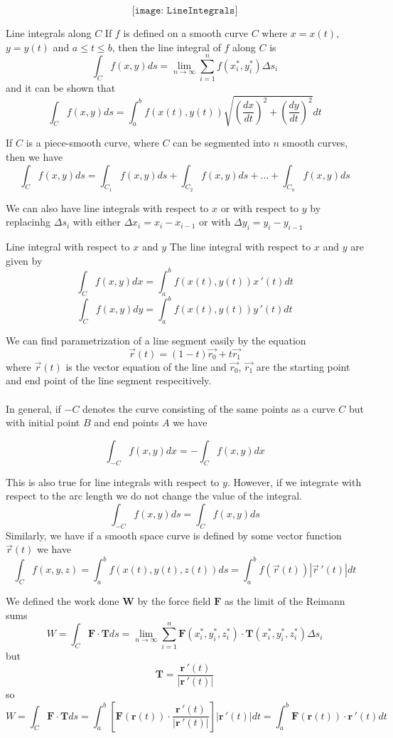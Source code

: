\documentclass{article}
\begin{document}
	\[
		\texttt{[image: LineIntegrals]}
	\]
	\begin{mybox}
		{Line integrals along $C$} If $f$ is defined on a smooth curve $C$ where $x=x
		(t)$, $y=y(t)$ and $a\leq t \leq b$, then the line integral of $f$ along $C$
		is
		\[
			\int_{C} f(x,y)ds = \lim_{n \to \infty}\sum_{i=1}^{n}f(x_{i}^{*}, y_{i}^{*}
			) \Delta s_{i}
		\]
		and it can be shown that
		\[
			\int_{C} f(x,y)ds = \int_{a}^{b} f(x(t),y(t))\sqrt{(\frac{dx}{dt})^{2} + (\frac{dy}{dt})^{2}
			}dt
		\]
	\end{mybox}

	If $C$ is a piece-smooth curve, where $C$ can be segmented into $n$ smooth curves,
	then we have
	\[
		\int_{C} f(x,y)ds = \int_{C_1}f(x,y)ds + \int_{C_2}f(x,y)ds + ...+ \int_{C_n}
		f(x,y)ds
	\]

	We can also have line integrals with respect to $x$ or with respect to $y$ by replacinhg
	$\Delta s_{i}$ with either $\Delta x_{i} = x_{i} - x_{i-1}$ or with $\Delta y_{i}
	= y_{i} - y_{i-1}$

	\begin{mybox}
		{Line integral with respect to $x$ and $y$} The line integral with respect to
		$x$ and $y$ are given by
		\[
			\int_{C} f(x,y)dx = \int_{a}^{b} f(x(t),y(t))x\,'(t)dt
		\]
		\[
			\int_{C} f(x,y)dy = \int_{a}^{b} f(x(t),y(t))y\,'(t)dt
		\]
	\end{mybox}

	We can find parametrization of a line segment easily by the equation
	\[
		\vec{r}(t) = (1-t)\vec{r_0}+t\vec{r_1}
	\]
	where $\vec{r}(t)$ is the vector equation of the line and $\vec{r_0}$,
	$\vec{r_1}$ are the starting point and end point of the line segment
	respecitively. \\\\ In general, if $-C$ denotes the curve consisting of the same
	points as a curve $C$ but with initial point $B$ and end points $A$ we have

	\[
		\int_{-C}f(x,y)dx = - \int_{C}f(x,y)dx
	\]

	This is also true for line integrals with respect to $y$. However, if we integrate
	with respect to the arc length we do not change the value of the integral.
	\[
		\int_{-C}f(x,y)ds = \int_{C}f(x,y)ds
	\]
	Similarly, we have if a smooth space curve is defined by some vector function $\vec
	{r}(t)$ we have
	\[
		\int_{C} f(x,y,z) = \int_{a}^{b} f(x(t),y(t),z(t))ds = \int_{a}^{b} f(\vec{r}
		(t))|\vec{r}\,'(t)|dt
	\]

	We defined the work done $\bm{W}$ by the force field $\bm{F}$ as the limit of
	the Reimann sums
	\[
		W = \int_{C} \bm{F}\cdot \bm{T}ds = \lim_{n \to \infty}\sum_{i=1}^{n}\bm{F}(x
		_{i}^{*}, y_{i}^{*}, z_{i}^{*}) \cdot \bm{T}(x_{i}^{*}, y_{i}^{*}, z_{i}^{*})
		\Delta s_{i}
	\]
	but
	\[
		\bm{T}= \frac{\bm{r}\,'(t)}{|\bm{r}\,'(t)|}
	\]
	so
	\[
		W = \int_{C} \bm{F}\cdot \bm{T}ds = \int_{a}^{b} \left[ \bm{F}(\bm{r}(t)) \cdot
		\frac{\bm{r}\,'(t)}{|\bm{r}\,'(t)|}\right] |\bm{r}\,'(t)| dt = \int_{a}^{b} \bm
		{F}(\bm{r}(t)) \cdot \bm{r}\,'(t) dt
	\]
\end{document}
